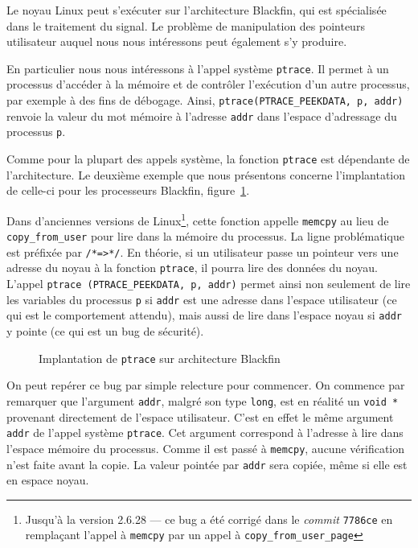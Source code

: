 Le noyau Linux peut s'exécuter sur l'architecture Blackfin, qui est spécialisée
dans le traitement du signal. Le problème de manipulation des pointeurs
utilisateur auquel nous nous intéressons peut également s'y produire.

En particulier nous nous intéressons à l'appel système \texttt{ptrace}. Il
permet à un processus d'accéder à la mémoire et de contrôler l'exécution d'un
autre processus, par exemple à des fins de débogage. Ainsi,
\texttt{ptrace(PTRACE\_PEEKDATA, p, addr)} renvoie la valeur du mot mémoire à
l'adresse \texttt{addr} dans l'espace d'adressage du processus \texttt{p}.

Comme pour la plupart des appels système, la fonction \texttt{ptrace} est
dépendante de l'architecture. Le deuxième exemple que nous présentons concerne
l'implantation de celle-ci pour les processeurs Blackfin,
figure~\ref{fig:ptrace-blackfin}.

Dans d'anciennes versions de Linux\footnote{Jusqu'à la version 2.6.28 --- ce bug
a été corrigé dans le \emph{commit} \texttt{7786ce} en remplaçant l'appel à
\texttt{memcpy} par un appel à \texttt{copy\_from\_user\_page}}, cette fonction
appelle \texttt{memcpy} au lieu de \nolinkurl{copy\_from\_user} pour lire dans
la mémoire du processus. La ligne problématique est préfixée par
\texttt{/*=\textgreater{}*/}. En théorie, si un utilisateur passe un pointeur
vers une adresse du noyau à la fonction \texttt{ptrace}, il pourra lire des
données du noyau. L'appel \texttt{ptrace (PTRACE\_PEEKDATA, p, addr)} permet
ainsi non seulement de lire les variables du processus \texttt{p} si
\texttt{addr} est une adresse dans l'espace utilisateur (ce qui est le
comportement attendu), mais aussi de lire dans l'espace noyau si \texttt{addr} y
pointe (ce qui est un bug de sécurité).

\begin{figure}
    \caption{Implantation de \texttt{ptrace} sur architecture Blackfin}
    \label{fig:ptrace-blackfin}
\end{figure}


On peut repérer ce bug par simple relecture pour commencer. On commence par
remarquer que l'argument \texttt{addr}, malgré son type \texttt{long}, est en
réalité un \texttt{void *} provenant directement de l'espace utilisateur. C'est
en effet le même argument \texttt{addr} de l'appel système \texttt{ptrace}.
Cet argument correspond à l'adresse à lire dans l'espace mémoire du processus.
Comme il est passé à \texttt{memcpy}, aucune vérification n'est faite avant la
copie. La valeur pointée par \texttt{addr} sera copiée, même si elle est en
espace noyau.

